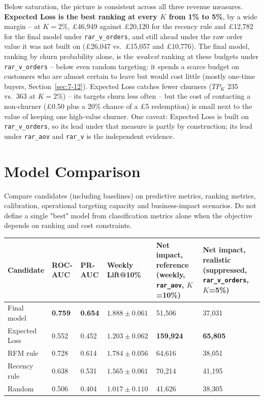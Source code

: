 Below saturation, the picture is consistent across all three revenue measures. \textbf{Expected Loss is the best ranking at every $K$ from 1\% to 5\%}, by a wide margin -- at $K=2\%$, \pounds46,949 against \pounds20,120 for the recency rule and \pounds12,782 for the final model under \texttt{rar\_v\_orders}, and still ahead under the raw order value it was not built on (\pounds26,047 vs.\ \pounds15,057 and \pounds10,776). The final model, ranking by churn probability alone, is the \emph{weakest} ranking at these budgets under \texttt{rar\_v\_orders} -- below even random targeting: it spends a scarce budget on customers who are almost certain to leave but would cost little (mostly one-time buyers, Section~\ref{sec:7-12}). Expected Loss catches fewer churners ($TP_K$ 235 vs.\ 363 at $K=2\%$) -- its targets churn less often -- but the cost of contacting a non-churner (\pounds0.50 plus a 20\% chance of a \pounds5 redemption) is small next to the value of keeping one high-value churner. One caveat: Expected Loss is built on \texttt{rar\_v\_orders}, so its lead under that measure is partly by construction; its lead under \texttt{rar\_aov} and \texttt{rar\_v} is the independent evidence.

\section{Model Comparison}
\label{sec:7-11}

Compare candidates (including baselines) on predictive metrics, ranking metrics, calibration, operational targeting capacity and business-impact scenarios. Do not define a single "best" model from classification metrics alone when the objective depends on ranking and cost constraints.

\begin{center}
\begin{tabular}{@{}p{2.6cm}p{1.4cm}p{1.4cm}p{2.6cm}p{2.8cm}p{3cm}@{}}
    \toprule
    Candidate & ROC-AUC & PR-AUC & Weekly Lift@10\% & Net impact, reference (weekly, \texttt{rar\_aov}, $K$=10\%) & Net impact, realistic (suppressed, \texttt{rar\_v\_orders}, $K$=5\%) \\
    \midrule
    Final model & \textbf{0.759} & \textbf{0.654} & $\mathbf{1.888 \pm 0.061}$ & 51,506 & 37,031 \\
    Expected Loss & 0.552 & 0.452 & $1.203 \pm 0.062$ & \textbf{159,924} & \textbf{65,805} \\
    RFM rule & 0.728 & 0.614 & $1.784 \pm 0.056$ & 64,616 & 38,051 \\
    Recency rule & 0.638 & 0.531 & $1.565 \pm 0.061$ & 70,214 & 41,195 \\
    Random & 0.506 & 0.404 & $1.017 \pm 0.110$ & 41,626 & 38,305 \\
    \bottomrule
\end{tabular}
\end{center}

